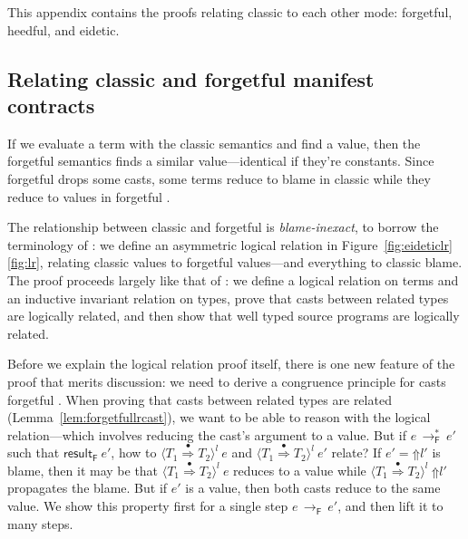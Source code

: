 \documentclass[9pt]{extarticle}
\newcommand{\reflr}{\ifpopl\ref{fig:eideticlr}\else\ref{fig:lr}\fi}
\newcommand{\ottnt}[1]{\mathit{#1}}
\newcommand{\ottsym}[1]{#1}
\begin{document}
{\iffull

This appendix contains the proofs relating classic \lambdah to each
other mode: forgetful, heedful, and eidetic.

\subsection{Relating classic and forgetful manifest contracts}
\label{sec:forgetfullr}

If we evaluate a \lambdah term with the classic semantics and find a
value, then the forgetful semantics finds a similar
value---identical if they're constants. Since forgetful \lambdah drops
some casts, some terms reduce to blame in classic \lambdah while they
reduce to values in forgetful \lambdah.

The relationship between classic and forgetful \lambdah is
\textit{blame-inexact}, to borrow the terminology of
\citet{Greenberg12contracts}: we define an asymmetric logical relation
in Figure~\reflr, relating classic values to forgetful
values---and everything to classic blame.
The proof proceeds largely like that of \citet{Greenberg12contracts}:
we define a logical relation on terms and an inductive invariant
relation on types, prove that casts between related types are
logically related, and then show that well typed source programs are
logically related.

Before we explain the logical relation proof itself, there is one new
feature of the proof that merits discussion: we need to derive a
congruence principle for casts forgetful \lambdah.
When proving that casts between related types are related
(Lemma~\ref{lem:forgetfullrcast}), we want to be able to reason with
the logical relation---which involves reducing the cast's argument to
a value. But if $\ottnt{e} \,  \longrightarrow ^{*}_{  \mathsf{F}  }  \, \ottnt{e'}$ such that $ \mathsf{result} _{  \mathsf{F}  }~ \ottnt{e'} $, how to
$ \langle  \ottnt{T_{{\mathrm{1}}}}  \mathord{ \overset{\bullet}{\Rightarrow} }  \ottnt{T_{{\mathrm{2}}}}  \rangle^{ \ottnt{l} } ~  \ottnt{e} $ and $ \langle  \ottnt{T_{{\mathrm{1}}}}  \mathord{ \overset{\bullet}{\Rightarrow} }  \ottnt{T_{{\mathrm{2}}}}  \rangle^{ \ottnt{l} } ~  \ottnt{e'} $ relate?
If $\ottnt{e'}  \ottsym{=}   \mathord{\Uparrow}  \ottnt{l'} $ is blame, then it may be that $ \langle  \ottnt{T_{{\mathrm{1}}}}  \mathord{ \overset{\bullet}{\Rightarrow} }  \ottnt{T_{{\mathrm{2}}}}  \rangle^{ \ottnt{l} } ~  \ottnt{e} $
reduces to a value while $ \langle  \ottnt{T_{{\mathrm{1}}}}  \mathord{ \overset{\bullet}{\Rightarrow} }  \ottnt{T_{{\mathrm{2}}}}  \rangle^{ \ottnt{l} } ~   \mathord{\Uparrow}  \ottnt{l'}  $ propagates the
blame. But if $\ottnt{e'}$ is a value, then both casts reduce to the same
value.
We show this property first for a single step $\ottnt{e} \,  \longrightarrow _{  \mathsf{F}  }  \, \ottnt{e'}$, and
then lift it to many steps.

}
\end{document}
